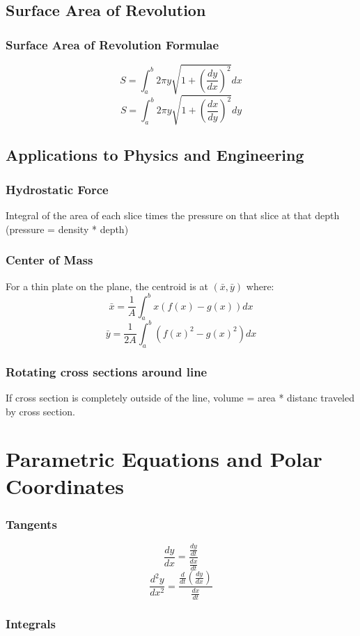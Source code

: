 \documentclass[a4paper,12pt]{report}
\begin{document}
\section{Surface Area of Revolution}
\subsection{Surface Area of Revolution Formulae}
$$S = \int_a^b 2\pi y \sqrt{1+(\frac{dy}{dx})^2}dx$$
$$S = \int_a^b 2\pi y \sqrt{1+(\frac{dx}{dy})^2}dy$$

\section{Applications to Physics and Engineering}
\subsection{Hydrostatic Force}
Integral of the area of each slice times the pressure on that slice at that depth (pressure = density * depth)

\subsection{Center of Mass}
For a thin plate on the plane, the centroid is at $(\bar{x}, \bar{y})$ where:
$$ \bar{x} = \frac{1}{A} \int_a^b x(f(x)-g(x))dx $$
$$ \bar{y} = \frac{1}{2A} \int_a^b (f(x)^2 -g(x)^2) dx$$

\subsection{Rotating cross sections around line}
If cross section is completely outside of the line, volume = area * distanc traveled by cross section.

\chapter{Parametric Equations and Polar Coordinates}
\subsection{Tangents}
$$\frac{dy}{dx} = \frac{ \frac{dy}{dt} }{ \frac{dx}{dt} }$$
$$\frac{d^2y}{dx^2} = \frac{ \frac{d}{dt}(\frac{dy}{dx}) }{ \frac{dx}{dt} }$$

\subsection{Integrals}
\end{document}
